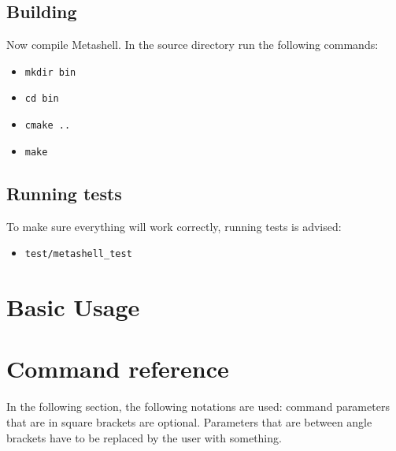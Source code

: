 \subsection{Building}

Now compile Metashell. In the source directory run the following commands:

\begin{itemize}
    \item \lstinline$mkdir bin$
    \item \lstinline$cd bin$
    \item \lstinline$cmake ..$
    \item \lstinline$make$
\end{itemize}

\subsection{Running tests}

To make sure everything will work correctly, running tests is advised:

\begin{itemize}
    \item \lstinline$test/metashell_test$
\end{itemize}

\section{Basic Usage}


\section{Command reference}

In the following section, the following notations are used: command parameters
that are in square brackets are optional. Parameters that are between angle
brackets have to be replaced by the user with something.



